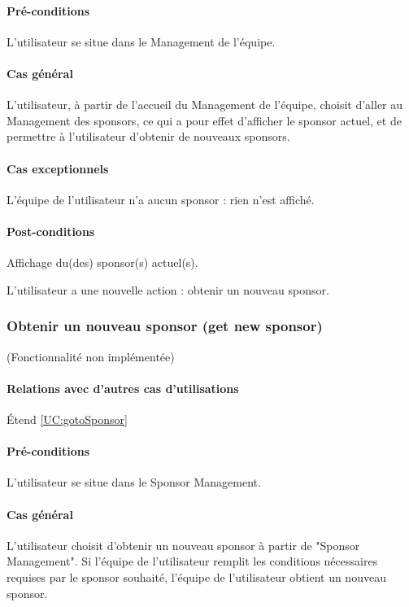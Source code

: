 \paragraph{Pré-conditions}
\begin{list}{}{\leftmargin=1.5em}
\item{L'utilisateur se situe dans le Management de l'équipe.}
\end{list}
\paragraph{Cas général}
L'utilisateur, à partir de l'accueil du Management de l'équipe, choisit d'aller au Management des sponsors, ce qui a pour effet d'afficher le sponsor actuel, et de permettre à l'utilisateur d'obtenir de nouveaux sponsors. 
\paragraph{Cas exceptionnels}
L'équipe de l'utilisateur n'a aucun sponsor : rien n'est affiché. 
\paragraph{Post-conditions}
\begin{list}{}{\leftmargin=1.5em}
\item{Affichage du(des) sponsor(s) actuel(s).}
\item{L'utilisateur a une nouvelle action : obtenir un nouveau sponsor.}
\end{list}

\subsubsection{Obtenir un nouveau sponsor (get new sponsor)}
\label{UC:getNewSponsor}
(Fonctionnalité non implémentée)
\paragraph{Relations avec d'autres cas d'utilisations}
Étend \ref{UC:gotoSponsor}
\paragraph{Pré-conditions}
\begin{list}{}{\leftmargin=1.5em}
\item{L'utilisateur se situe dans le Sponsor Management.}
\end{list}
\paragraph{Cas général}
L'utilisateur choisit d'obtenir un nouveau sponsor à partir de "Sponsor Management". Si l'équipe de l'utilisateur remplit les conditions nécessaires requises par le sponsor souhaité, l'équipe de l'utilisateur obtient un nouveau sponsor. 

